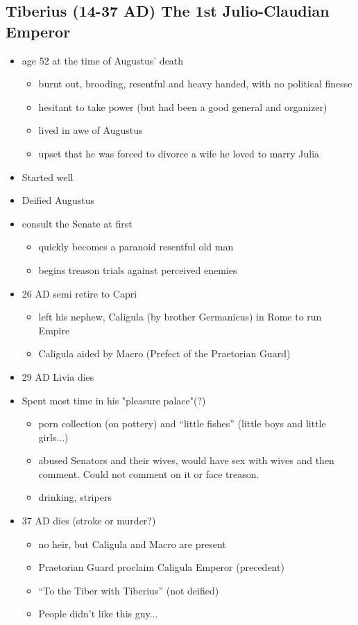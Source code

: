 \documentclass[12pt, twoside]{article}
\begin{document}
\subsection{Tiberius (14-37 AD) The 1st Julio-Claudian Emperor}
\begin{itemize}
\item age 52 at the time of Augustus’ death
	\begin{itemize}
	\item burnt out, brooding, resentful and heavy handed, with no political finesse
	\item hesitant to take power (but had been a good general and organizer)
	\item lived in awe of Augustus
	\item upset that he was forced to divorce a wife he loved to marry Julia
	\end{itemize}
\item Started well
\item Deified Augustus
\item consult the Senate at first
	\begin{itemize}
	\item quickly becomes a paranoid resentful old man
	\item begins treason trials against perceived enemies
	\end{itemize}
\item 26 AD semi retire to Capri
	\begin{itemize}
	\item left his nephew, Caligula (by brother Germanicus) in Rome to run Empire
	\item Caligula aided by Macro (Prefect of the Praetorian Guard)
	\end{itemize}
\item 29 AD Livia dies
\item Spent most time in his "pleasure palace"(?)
	\begin{itemize}
	\item porn collection (on pottery) and “little fishes” (little boys and little girls...)
	\item abused Senators and their wives, would have sex with wives and then comment.  Could not comment on it or face treason.
	\item drinking, stripers
	\end{itemize}
\item 37 AD dies (stroke or murder?)
	\begin{itemize}
	\item no heir, but Caligula and Macro are present
	\item Praetorian Guard proclaim Caligula Emperor (precedent)
	\item “To the Tiber with Tiberius” (not deified)
	\item People didn't like this guy...
	\end{itemize}
\end{itemize}
\end{document}
